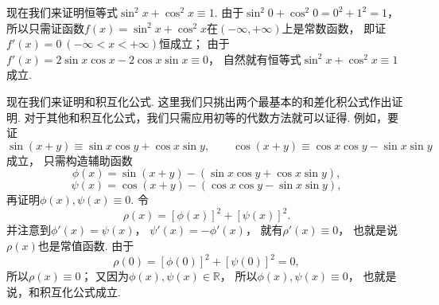 现在我们来证明恒等式\(\sin^2 x + \cos^2 x \equiv 1\).
由于\(\sin^2 0 + \cos^2 0 = 0^2 + 1^2 = 1\)，
所以只需证函数\(f(x) = \sin^2 x + \cos^2 x\)在\((-\infty,+\infty)\)上是常数函数，
即证\(f'(x) = 0\ (-\infty<x<+\infty)\)恒成立；
由于\(f'(x) = 2 \sin x \cos x - 2 \cos x \sin x \equiv 0\)，
自然就有恒等式\(\sin^2 x + \cos^2 x \equiv 1\)成立.

现在我们来证明和积互化公式.
这里我们只挑出两个最基本的和差化积公式作出证明.
对于其他和积互化公式，我们只需应用初等的代数方法就可以证得.
例如，要证\[
\sin(x+y) \equiv \sin x \cos y + \cos x \sin y,
\qquad
\cos(x+y) \equiv \cos x \cos y - \sin x \sin y
\]成立，
只需构造辅助函数\[
\phi(x)
= \sin(x+y) - (\sin x \cos y + \cos x \sin y),
\]\[
\psi(x)
= \cos(x+y) - (\cos x \cos y - \sin x \sin y),
\]再证明\(\phi(x),\psi(x) \equiv 0\).
令\[
\rho(x)
= [\phi(x)]^2 + [\psi(x)]^2.
\]
并注意到\(\phi'(x) = \psi(x)\)，
\(\psi'(x) = -\phi'(x)\)，
就有\(\rho'(x) \equiv 0\)，
也就是说\(\rho(x)\)也是常值函数.
由于\[
\rho(0) = [\phi(0)]^2 + [\psi(0)]^2 = 0,
\]
所以\(\rho(x) \equiv 0\)；
又因为\(\phi(x),\psi(x) \in \mathbb{R}\)，
所以\(\phi(x),\psi(x) \equiv 0\)，
也就是说，和积互化公式成立.
